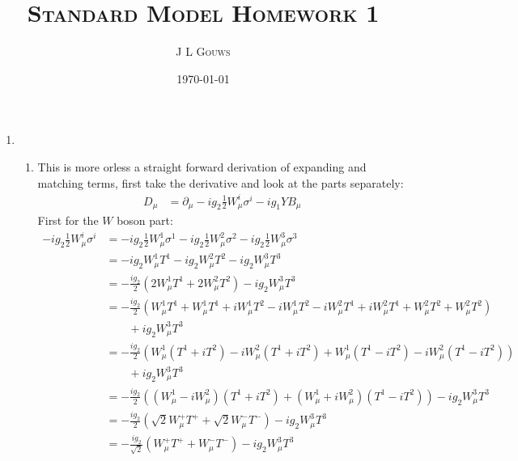 \documentclass[12pt,a4]{article}
\title{
\textsc{Standard Model Homework 1}
}
\author{\textsc{J L Gouws}
}
\date{\today
\\[1cm]}
\begin{document}
\thispagestyle{empty}

\maketitle

\begin{enumerate}
  \item
    \begin{enumerate}
      \item
        This is more orless a straight forward derivation of expanding and matching terms, first take the derivative and look at the parts separately:
        \begin{align*}
          D_\mu &= \partial_\mu - ig_2 \frac{1}{2} W^i_\mu \sigma^i - i g_1 Y B_\mu
        \end{align*}
        First for the $W$ boson part:
        \begin{align*}
          - ig_2 \frac{1}{2} W^i_\mu \sigma^i &= - ig_2 \frac{1}{2} W^1_\mu \sigma^1 - ig_2 \frac{1}{2} W^2_\mu \sigma^2  - ig_2 \frac{1}{2} W^3_\mu \sigma^3\\
                                              &= - ig_2 W^1_\mu T^1 - ig_2 W^2_\mu T^2  - ig_2  W^3_\mu T^3\\
                                              &= - \frac{ig_2}{2} (2W^1_\mu T^1 + 2W^2_\mu T^2)  - ig_2  W^3_\mu T^3\\
                                              &= - \frac{ig_2}{2} (W^1_\mu T^1 + W^1_\mu T^1 + i W^1_\mu T^2 - i W^1_\mu T^2 - i W^2_\mu T^1  + i W^2_\mu T^1 + W^2_\mu T^2 + W^2_\mu T^2)\\
                                              & \qquad + ig_2  W^3_\mu T^3\\
                                              &= - \frac{ig_2}{2} (W^1_\mu(T^1 + i T^2) - i W^2_\mu(T^1 + i T^2) + W^1_\mu(T^1 - i T^2) - i W^2_\mu(T^1 - i T^2))\\
                                              & \qquad + ig_2  W^3_\mu T^3\\
                                              &= - \frac{ig_2}{2} ((W^1_\mu - i W^2_\mu)(T^1 + i T^2) + (W^1_\mu + i W^2_\mu)(T^1 - i T^2))  - ig_2  W^3_\mu T^3\\
                                              &= - \frac{ig_2}{2} (\sqrt{2}W^+_\mu T^+ + \sqrt{2}W^-_\mu T^-)  - ig_2  W^3_\mu T^3\\
                                              &= - \frac{ig_2}{\sqrt{2}} (W^+_\mu T^+ + W^-_\mu T^-)  - ig_2  W^3_\mu T^3

\end{align*}
\end{enumerate}
\end{enumerate}
\end{document}
